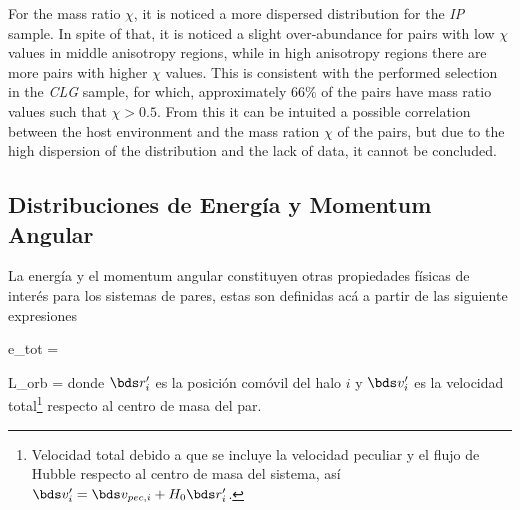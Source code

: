 For the mass ratio $\chi$, it is noticed a more dispersed distribution for
the \textit{IP} sample. In spite of that, it is noticed a slight 
over-abundance for pairs with low $\chi$ values in middle anisotropy 
regions, while in high anisotropy regions there are more pairs with 
higher $\chi$ values. This is consistent with the performed selection in
the \textit{CLG} sample, for which, approximately $66\%$ of the pairs
have mass ratio values such that $\chi>0.5$. From this it can be intuited
a possible correlation between the host environment and the mass ration 
$\chi$ of the pairs, but due to the high dispersion of the distribution
and the lack of data, it cannot be concluded.


\newpage

	\subsection{Distribuciones de Energía y Momentum Angular}
	\label{subsec:AngularMomentumAndEnergy}


La energía y el momentum angular constituyen otras propiedades físicas de
interés para los sistemas de pares, estas son definidas acá a partir de las
siguiente expresiones


{ e_{tot} = 
 }


{ \bds L_{orb} = }
donde $\bds r_i'$ es la posición comóvil del halo $i$ y $\bds v_i'$ es la 
velocidad total\footnote{Velocidad total debido a que se incluye la velocidad 
peculiar y el flujo de Hubble respecto al centro de masa del sistema, así 
$\bds v_i' = \bds v_{pec,i} + H_0 \bds r_i'$. } respecto al centro de 
masa del par.


